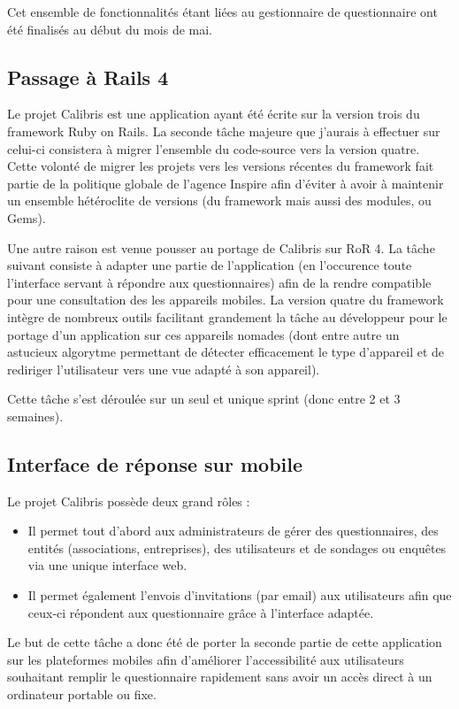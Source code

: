 \documentclass[12pt,a4paper]{book}
\begin{document}
Cet ensemble de fonctionnalités étant liées au gestionnaire de questionnaire ont été finalisés au début du mois de mai.

\subsection{Passage à Rails 4}

Le projet Calibris est une application ayant été écrite sur la version trois du framework Ruby on Rails. La seconde tâche majeure que j'aurais à effectuer sur celui-ci consistera à migrer l'ensemble du code-source vers la version quatre. Cette volonté de migrer les projets vers les versions récentes du framework fait partie de la politique globale de l'agence Inspire afin d'éviter à avoir à maintenir un ensemble hétéroclite de versions (du framework mais aussi des modules, ou Gems).

Une autre raison est venue pousser au portage de Calibris sur RoR 4. La tâche suivant consiste à adapter une partie de l'application (en l'occurence toute l'interface servant à répondre aux questionnaires) afin de la rendre compatible pour une consultation des les appareils mobiles. La version quatre du framework intègre de nombreux outils facilitant grandement la tâche au développeur pour le portage d'un application sur ces appareils nomades (dont entre autre un astucieux algorytme permettant de détecter efficacement le type d'appareil et de rediriger l'utilisateur vers une vue adapté à son appareil).

Cette tâche s'est déroulée sur un seul et unique sprint (donc entre 2 et 3 semaines).

\subsection{Interface de réponse sur mobile}

Le projet Calibris possède deux grand rôles :
\begin{itemize}
  \item Il permet tout d'abord aux administrateurs de gérer des questionnaires, des entités (associations, entreprises), des utilisateurs et de sondages ou enquêtes via une unique interface web.
  \item Il permet également l'envois d'invitations (par email) aux utilisateurs afin que ceux-ci répondent aux questionnaire grâce à l'interface adaptée.  
\end{itemize}

Le but de cette tâche a donc été de porter la seconde partie de cette application sur les plateformes mobiles afin d'améliorer l'accessibilité aux utilisateurs souhaitant remplir le questionnaire rapidement sans avoir un accès direct à un ordinateur portable ou fixe.
\end{document}
